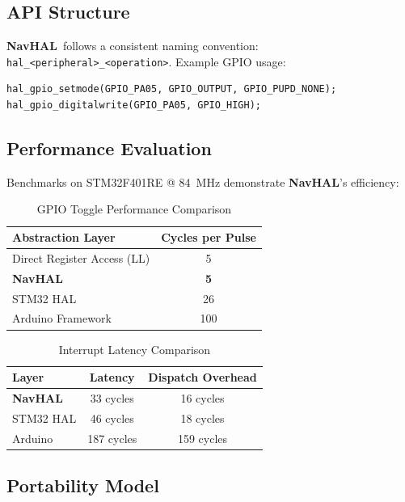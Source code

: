 \documentclass[11pt]{article}
\newcommand{\navhal}{\textbf{NavHAL}}
\begin{document}
\subsection{API Structure}

\navhal~follows a consistent naming convention: \texttt{hal\_<peripheral>\_<operation>}. Example GPIO usage:

\begin{verbatim}
hal_gpio_setmode(GPIO_PA05, GPIO_OUTPUT, GPIO_PUPD_NONE);
hal_gpio_digitalwrite(GPIO_PA05, GPIO_HIGH);
\end{verbatim}

\subsection{Performance Evaluation}

Benchmarks on STM32F401RE @ 84~MHz demonstrate \navhal's efficiency:

\begin{table}[H]
\centering
\caption{GPIO Toggle Performance Comparison}
\begin{tabular}{lc}
\toprule
\textbf{Abstraction Layer} & \textbf{Cycles per Pulse} \\
\midrule
Direct Register Access (LL) & 5 \\
\textbf{NavHAL} & \textbf{5} \\
STM32 HAL & 26 \\
Arduino Framework & 100 \\
\bottomrule
\end{tabular}
\end{table}

\vspace{-0.5cm}

\begin{table}[H]
\centering
\caption{Interrupt Latency Comparison}
\begin{tabular}{lcc}
\toprule
\textbf{Layer} & \textbf{Latency} & \textbf{Dispatch Overhead} \\
\midrule
\textbf{NavHAL} & 33 cycles & 16 cycles \\
STM32 HAL & 46 cycles & 18 cycles \\
Arduino & 187 cycles & 159 cycles \\
\bottomrule
\end{tabular}
\end{table}

\subsection{Portability Model}
\end{document}
